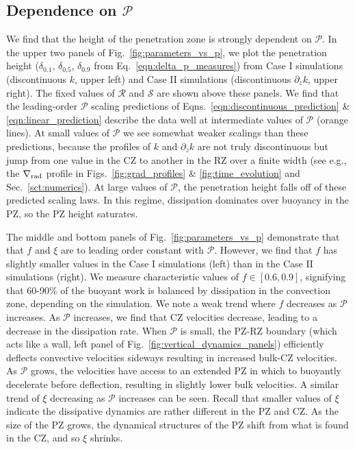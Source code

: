 \documentclass[twocolumn, linenumbers]{aastex631}
\newcommand{\gradrad}{\ensuremath{\nabla_{\rm{rad}}}}
\newcommand{\mP}{\ensuremath{\mathcal{P}}}
\newcommand{\mR}{\ensuremath{\mathcal{R}}}
\newcommand{\mS}{\ensuremath{\mathcal{S}}}
\newcommand{\editone}[1]{#1}
\begin{document}
\subsection{Dependence on $\mP$}
We find that the height of the penetration zone is strongly dependent on $\mP$.
In the upper two panels of Fig.~\ref{fig:parameters_vs_p}, we plot the penetration height ($\delta_{0.1}$, $\delta_{0.5}$, $\delta_{0.9}$ from Eq.~\ref{eqn:delta_p_measures}) from Case I simulations (discontinuous $k$, upper left) and Case II simulations (discontinuous $\partial_z k$, upper right).
The fixed values of $\mR$ and $\mS$ are shown above these panels.
We find that the leading-order $\mP$ scaling predictions of Eqns.~\ref{eqn:discontinuous_prediction} \& \ref{eqn:linear_prediction} describe the data \editone{well at intermediate values of $\mP$} (orange lines).
At small values of $\mP$ we see somewhat weaker scalings than these predictions, because the profiles of $k$ and $\partial_z k$ are not truly discontinuous but jump from one value in the CZ to another in the RZ over a finite width (see e.g., the $\gradrad$ profile in Figs.~\ref{fig:grad_profiles} \& \ref{fig:time_evolution} and Sec.~\ref{sct:numerics}).
At large values of $\mP$, the penetration height falls off of these predicted scaling laws.
In this regime, dissipation dominates over buoyancy in the PZ, so the PZ height saturates.

The middle and bottom panels of Fig.~\ref{fig:parameters_vs_p} demonstrate that that $f$ and $\xi$ are to leading order constant with $\mP$.
However, we find that $f$ has slightly smaller values in the Case I simulations (left) than in the Case II simulations (right).
We measure characteristic values of $f \in [0.6, 0.9]$, signifying that 60-90\% of the buoyant work is balanced by dissipation in the convection zone, depending on the simulation.
We note a weak trend where $f$ decreases as $\mP$ increases.
As $\mP$ increases, we find that CZ velocities decrease, leading to a decrease in the dissipation rate.
When $\mP$ is small, the PZ-RZ boundary (which acts like a wall, left panel of Fig.~\ref{fig:vertical_dynamics_panels}) efficiently deflects convective velocities sideways resulting in increased bulk-CZ velocities.
As $\mP$ grows, the velocities have access to an extended PZ in which to buoyantly \editone{decelerate} before deflection, resulting in slightly lower bulk velocities.
A similar trend of $\xi$ decreasing as $\mP$ increases can be seen.
Recall that smaller values of $\xi$ indicate the dissipative dynamics are rather different in the PZ and CZ.
As the size of the PZ grows, the dynamical structures of the PZ shift from what is found in the CZ, and so $\xi$ shrinks.
\end{document}
